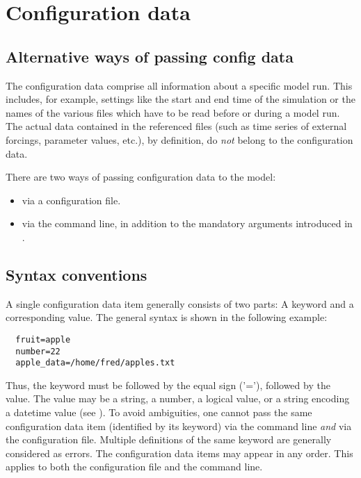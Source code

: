 \FloatBarrier

\section{Configuration data} \label{sec:input-config}

\subsection{Alternative ways of passing config data} \label{sec:input-config-passing}
The configuration data  comprise all information about a specific model run. This includes, for example, settings like the start and end time of the simulation or the names of the various files which have to be read before or during a model run. The actual data contained in the referenced files (such as time series of external forcings, parameter values, etc.), by definition, do \emph{not} belong to the configuration data.

There are two ways of passing configuration data to the model:
\begin{itemize}
  \item via a configuration file.
  \item via the command line, in addition to the mandatory arguments introduced in .
\end{itemize}

\subsection{Syntax conventions} \label{sec:input-config-syntax}
A single configuration data item generally consists of two parts: A keyword and a corresponding value. The general syntax is shown in the following example:

\medskip
\begin{verbatim}
  fruit=apple
  number=22
  apple_data=/home/fred/apples.txt
\end{verbatim}
\medskip

Thus, the keyword must be followed by the equal sign ('='), followed by the value. The value may be a string, a number, a logical value, or a string encoding a datetime value (see ). To avoid ambiguities, one cannot pass the same configuration data item (identified by its keyword) via the command line \emph{and} via the configuration file. Multiple definitions of the same keyword are generally considered as errors. The configuration data items may appear in any order. This applies to both the configuration file and the command line.

